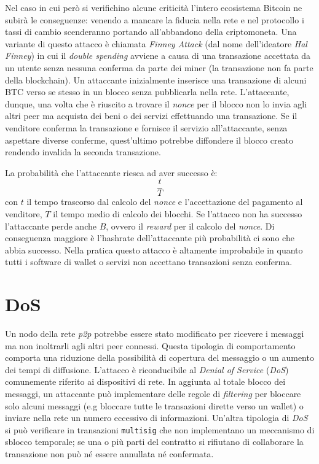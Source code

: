 Nel caso in cui però si verifichino alcune criticità l'intero ecosistema Bitcoin ne subirà le conseguenze: venendo a mancare la fiducia nella rete e nel protocollo i tassi di cambio scenderanno portando all'abbandono della criptomoneta.\newline\newline
Una variante di questo attacco è chiamata \textit{Finney Attack} (dal nome dell'ideatore \textit{Hal Finney}) in cui il \textit{double spending} avviene a causa di una transazione accettata da un utente senza nessuna conferma da parte dei miner (la transazione non fa parte della blockchain). Un attaccante inizialmente inserisce una transazione di alcuni BTC verso se stesso in un blocco senza pubblicarla nella rete. L'attaccante, dunque, una volta che è riuscito a trovare il \textit{nonce} per il blocco non lo invia agli altri peer ma acquista dei beni o dei servizi effettuando una transazione. Se il venditore conferma la transazione e fornisce il servizio all'attaccante, senza aspettare diverse conferme, quest'ultimo potrebbe diffondere il blocco creato rendendo invalida la seconda transazione.

La probabilità che l'attaccante riesca ad aver successo è:
\begin{equation}
    \frac{t}{T}
\end{equation}
con $t$ il tempo trascorso dal calcolo del \textit{nonce} e l'accettazione del pagamento al venditore, $T$ il tempo medio di calcolo dei blocchi. Se l'attacco non ha successo l'attaccante perde anche $B$, ovvero il \textit{reward} per il calcolo del \textit{nonce}.\newline
Di conseguenza maggiore è l'hashrate dell'attaccante più probabilità ci sono che abbia successo. Nella pratica questo attacco è altamente improbabile in quanto tutti i software di wallet o servizi non accettano transazioni senza conferma.

\section{DoS}
Un nodo della rete \textit{p2p} potrebbe essere stato modificato per ricevere i messaggi ma non inoltrarli agli altri peer connessi. Questa tipologia di comportamento comporta una riduzione della possibilità di copertura del messaggio o un aumento dei tempi di diffusione. L'attacco è riconducibile al \textit{Denial of Service} (\textit{DoS}) comunemente riferito ai dispositivi di rete.\newline
In aggiunta al totale blocco dei messaggi, un attaccante può implementare delle regole di \textit{filtering} per bloccare solo alcuni messaggi (e.g bloccare tutte le transazioni dirette verso un wallet) o inviare nella rete un numero eccessivo di informazioni.\newline
Un'altra tipologia di \textit{DoS} si può verificare in transazioni \texttt{multisig} che non implementano un meccanismo di sblocco temporale; se una o più parti del contratto si rifiutano di collaborare la transazione non può né essere annullata né confermata.

